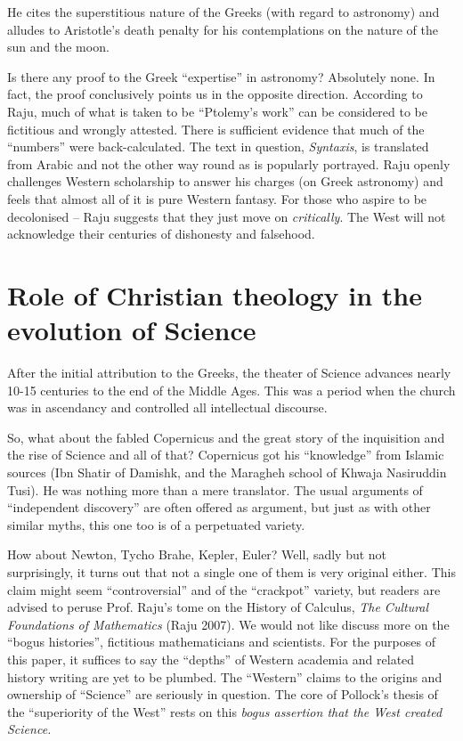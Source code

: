 He cites the superstitious nature of the Greeks (with regard to astronomy) and alludes to Aristotle’s death penalty for his contemplations on the nature of the sun and the moon.

Is there any proof to the Greek “expertise” in astronomy? Absolutely none. In fact, the proof conclusively points us in the opposite direction. According to Raju, much of what is taken to be “Ptolemy’s work” can be considered to be fictitious and wrongly attested. There is sufficient evidence that much of the “numbers” were back-calculated. The text in question, \textit{Syntaxis}, is translated from Arabic and not the other way round as is popularly portrayed. Raju openly challenges Western scholarship to answer his charges (on Greek astronomy) and feels that almost all of it is pure Western fantasy. For those who aspire to be decolonised – Raju suggests that they just move on \textit{critically}. The West will not acknowledge their centuries of dishonesty and falsehood.


\section*{Role of Christian theology in the evolution of Science}

After the initial attribution to the Greeks, the theater of Science advances nearly 10-15 centuries to the end of the Middle Ages. This was a period when the church was in ascendancy and controlled all intellectual discourse.

So, what about the fabled Copernicus and the great story of the inquisition and the rise of Science and all of that? Copernicus got his “knowledge” from Islamic sources (Ibn Shatir of Damishk, and the Maragheh school of Khwaja Nasiruddin Tusi). He was nothing more than a mere translator. The usual arguments of “independent discovery” are often offered as argument, but just as with other similar myths, this one too is of a perpetuated variety.

How about Newton, Tycho Brahe, Kepler, Euler? Well, sadly but not surprisingly, it turns out that not a single one of them is very original either. This claim might seem “controversial” and of the “crackpot” variety, but readers are advised to peruse Prof. Raju’s tome on the History of Calculus, \textit{The Cultural Foundations of Mathematics} (Raju 2007). We would not like discuss more on the “bogus histories”, fictitious mathematicians and scientists. For the purposes of this paper, it suffices to say the “depths” of Western academia and related history writing are yet to be plumbed. The “Western” claims to the origins and ownership of “Science” are seriously in question. The core of Pollock’s thesis of the “superiority of the West” rests on this \textit{bogus assertion that the West created Science.}

